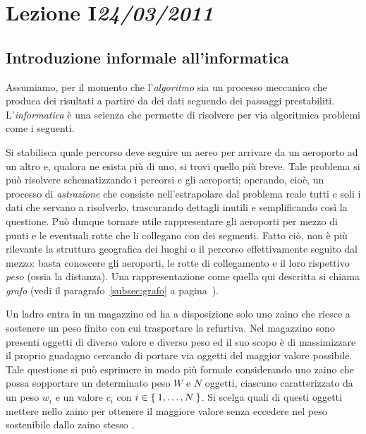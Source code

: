 \chapter[Lezione I]{Lezione I\newline\small{\emph{24/03/2011}}}
	\section{Introduzione informale all'informatica}

Assumiamo, per il momento che l'\emph{algoritmo} sia un processo meccanico che produca dei risultati a partire da dei dati seguendo dei passaggi prestabiliti.
L'\emph{informatica} è una scienza che permette di risolvere per via algoritmica problemi come i seguenti.


Si stabilisca quale percorso deve seguire un aereo per arrivare da un aeroporto ad un altro e, qualora ne esista più di uno, si trovi quello più breve.
Tale problema si può risolvere schematizzando i percorsi e gli aeroporti; operando, cioè, un processo di \emph{astrazione} che consiste nell'estrapolare dal problema reale tutti e soli i dati che servano a risolverlo, trascurando dettagli inutili e semplificando così la questione.
Può dunque tornare utile rappresentare gli aeroporti per mezzo di punti e le eventuali rotte che li collegano con dei segmenti.
Fatto ciò, non è più rilevante la struttura geografica dei luoghi o il percorso effettivamente seguito dal mezzo: basta conoscere gli aeroporti, le rotte di collegamento e il loro rispettivo \emph{peso} (ossia la distanza).
Una rappresentazione come quella qui descritta si chiama \emph{grafo} (vedi il paragrafo~\ref{subsec:grafo} a pagina~\pageref{subsec:grafo}).



Un ladro entra in un magazzino ed ha a disposizione solo uno zaino che riesce a sostenere un peso finito con cui trasportare la refurtiva.
Nel magazzino sono presenti oggetti di diverso valore e diverso peso ed il suo scopo è di massimizzare il proprio guadagno cercando di portare via oggetti del maggior valore possibile.
Tale questione si può esprimere in modo più formale considerando uno zaino che possa sopportare un determinato peso $W$ e $N$ oggetti, ciascuno caratterizzato da un peso $w_i$ e un valore $c_i$ con $i\in\Set{1,\dots,N}$.
Si scelga quali di questi oggetti mettere nello zaino per ottenere il maggiore valore senza eccedere nel peso sostenibile dallo zaino stesso \cite{wiki:zaino}.

